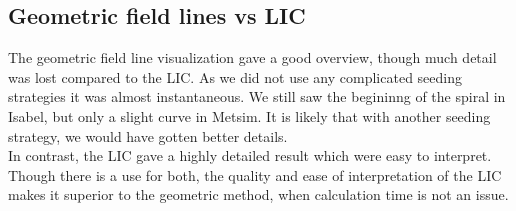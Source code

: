 \documentclass[11pt,a4paper,english]{article}
\numberwithin{equation}{section}
\begin{document}
\subsection{Geometric field lines vs LIC}
The geometric field line visualization gave a good overview, though much detail was lost compared to the LIC. As we did not use any complicated seeding strategies it was almost instantaneous. We still saw the begininng of the spiral in Isabel, but only a slight curve in Metsim. It is likely that with another seeding strategy, we would have gotten better details.
\\
In contrast, the LIC gave a highly detailed result which were easy to interpret. Though there is a use for both, the quality and ease of interpretation of the LIC makes it superior to the geometric method, when calculation time is not an issue.
\end{document}
